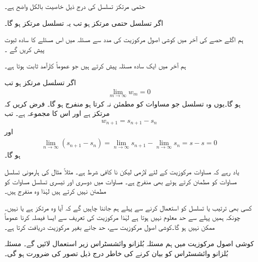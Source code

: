 حتمی مرتکز تسلسل کی درج ذیل خاصیت بالکل واضح ہے۔

اگر تسلسل  حتمی مرتکز ہو تب یہ تسلسل مرتکز ہو گا۔

ہم اگلے حصے کی آخر میں کوشی اصول مرکوزیت کی مدد سے مسئلہ  میں   اس مسئلے کا سادہ ثبوت پیش کریں گے ۔

ہم آخر میں ایک سادہ مسئلہ پیش کرتے ہیں جو عموماً کارآمد ثابت ہوتا ہے۔

اگر تسلسل  مرتکز ہو تب
\begin{align}\label{مساوات_ترتیب_مرکوزیت_شرط}
\lim_{m\to\infty} w_m=0
\end{align}
ہو گا۔یوں وہ تسلسل جو مساوات  کو مطمئن نہ کرتا ہو منفرج ہو گا۔
\quad
فرض کریں کہ  مرتکز ہے اور اس کا مجموعہ  ہے۔ تب 
\begin{align*}
w_{n+1}=s_{n+1}-s_n
\end{align*}
اور
\begin{align*}
\lim_{n\to\infty} (s_{n+1}-s_n)=\lim_{n\to\infty}s_{n+1} -\lim_{n\to\infty}s_n=s-s=0
\end{align*}
ہو گا۔

یاد رہے کہ مساوات  مرکوزیت کے لئے لازمی لیکن نا کافی شرط ہے۔ مثلاً مثال  کی ہارمونی تسلسل مساوات  کو مطمئن کرتے ہوئے بھی  منفرج ہے۔  مساوات  میں دوسری اور تیسری تسلسل مساوات   کو مطمئن نہیں کرتے ہیں لہٰذا وہ منفرج ہیں۔

کسی بھی ترتیب یا تسلسل کو استعمال کرنے سے پہلے ہم جاننا چاہیں گے کہ آیا وہ مرتکز ہے یا نہیں۔چونکہ ہمیں پہلے سے حد معلوم نہیں ہوتا ہے لہٰذا مرکوزیت کی تعریف سے ایسا فیصلہ کرنا عموماً ممکن نہیں ہو گا۔کوشی اصول مرکوزیت سے، حد جانے بغیر مرکوزیت دریافت کرتا ہے۔

کوشی اصول مرکوزیت میں ہم  مسئلہ بُلزانو وائشسٹراس زیر استعمال لائیں گے۔ مسئلہ بُلزانو وائشسٹراس کو بیان کرنے کی خاطر درج ذیل تصور کی ضرورت ہو گی۔  

